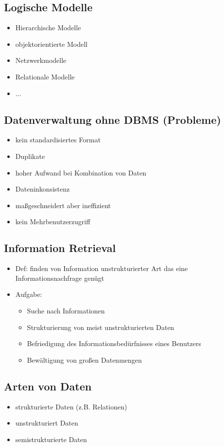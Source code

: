 \documentclass[a4paper]{article}
\begin{document}
\subsection{Logische Modelle}
\begin{itemize}
    \item Hierarchische Modelle
    \item objektorientierte Modell
    \item Netzwerkmodelle
    \item Relationale Modelle
    \item ...
\end{itemize}

\subsection{Datenverwaltung ohne DBMS (Probleme)}
\begin{itemize}
    \item kein standardisiertes Format
    \item Duplikate
    \item hoher Aufwand bei Kombination von Daten
    \item Dateninkonsistenz
    \item maßgeschneidert aber ineffizient
    \item kein Mehrbenutzerzugriff
\end{itemize}

\subsection{Information Retrieval}
\begin{itemize}
    \item Def: finden von Information unstrukturierter Art das eine Informationsnachfrage genügt
    \item Aufgabe:
    \begin{itemize}
        \item Suche nach Informationen
        \item Strukturierung von meist unstrukturierten Daten
        \item Befriedigung des Informationsbedürfnisses eines Benutzers
        \item Bewältigung von großen Datenmengen
    \end{itemize}
\end{itemize}

\subsection{Arten von Daten}
\begin{itemize}
    \item strukturierte Daten (z.B. Relationen)
    \item unstrukturiert Daten 
    \item semistrukturierte Daten
\end{itemize}
\end{document}
